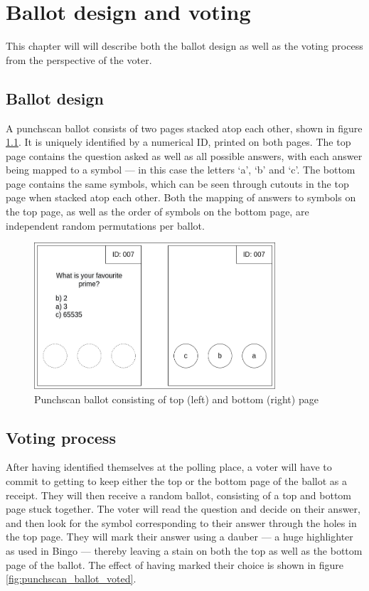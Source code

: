 \chapter{Ballot design and voting}
\label{ch:ballot_design_and_voting}

This chapter will will describe both the ballot design as well as the voting
process from the perspective of the voter.

\section{Ballot design}

A punchscan ballot consists of two pages stacked atop each other, shown in
figure \ref{fig:punchscan_ballot}. It is uniquely identified by a numerical ID,
printed on both pages. The top page contains the question asked as well as all
possible answers, with each answer being mapped to a symbol --- in this case
the letters `a', `b' and `c'. The bottom page contains the same symbols, which
can be seen through cutouts in the top page when stacked atop each other. Both
the mapping of answers to symbols on the top page, as well as the order of
symbols on the bottom page, are independent random permutations per ballot.

\begin{figure}
\centering
\includegraphics[width=0.8\textwidth]{../resources/high_level_ballot.drawio}
\caption{Punchscan ballot consisting of top (left) and bottom (right) page}
\label{fig:punchscan_ballot}
\end{figure}

\section{Voting process}

After having identified themselves at the polling place, a voter will have to
commit to getting to keep either the top or the bottom page of the ballot as a
receipt. They will then receive a random ballot, consisting of a top and bottom
page stuck together. The voter will read the question and decide on their
answer, and then look for the symbol corresponding to their answer through the
holes in the top page. They will mark their answer using a dauber --- a huge
highlighter as used in Bingo --- thereby leaving a stain on both the top as
well as the bottom page of the ballot. The effect of having marked their choice
is shown in figure \ref{fig:punchscan_ballot_voted}.

